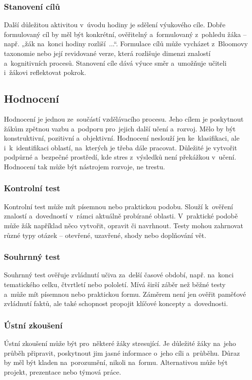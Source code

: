 \documentclass[male,czech,api_bc]{kitheses}
\begin{document}
\subsubsection{Stanovení cílů} Další důležitou aktivitou v~úvodu hodiny je sdělení výukového cíle. Dobře formulovaný cíl by měl být konkrétní, ověřitelný a~formulovaný z~pohledu žáka – např. „žák na~konci hodiny rozliší~...“. Formulace cílů může vycházet z~Bloomovy taxonomie nebo její revidované verze, která rozlišuje dimenzi znalostí a~kognitivních procesů. Stanovení cíle dává výuce směr a~umožňuje učiteli i~žákovi reflektovat pokrok.

\subsection{Hodnocení}
Hodnocení je jednou ze~součástí vzdělávacího procesu. Jeho cílem je poskytnout žákům zpětnou vazbu a~podporu pro~jejich další učení a~rozvoj. Mělo by být konstruktivní, pozitivní a~objektivní. Hodnocení neslouží jen ke~klasifikaci, ale i~k~identifikaci oblastí, na~kterých je třeba dále pracovat. Důležité je vytvořit podpůrné a~bezpečné prostředí, kde stres z~výsledků není překážkou v~učení. Hodnocení tak může být nástrojem rozvoje, ne trestu.

\subsubsection{Kontrolní test}
Kontrolní test může mít písemnou nebo praktickou podobu. Slouží k~ověření znalostí a~dovedností v~rámci aktuálně probírané oblasti. V~praktické podobě může žák například něco vytvořit, opravit či navrhnout. Testy mohou zahrnovat různé typy otázek – otevřené, uzavřené, shody nebo doplňování vět.

\subsubsection{Souhrnný test}
Souhrnný test ověřuje zvládnutí učiva za~delší časové období, např. na~konci tematického celku, čtvrtletí nebo pololetí. Mívá širší záběr než běžné testy a~může mít písemnou nebo praktickou formu. Záměrem není jen ověřit paměťové zvládnutí faktů, ale také schopnost propojit klíčové koncepty a~dovednosti.

\subsubsection{Ústní zkoušení}
Ústní zkoušení může být pro~některé žáky stresující. Je důležité žáky na~jeho průběh připravit, poskytnout jim jasné informace o~jeho cíli a~průběhu. Důraz by měl být kladen na~porozumění, nikoli na~formu. Alternativou může být projekt, prezentace nebo týmová práce.
\end{document}
